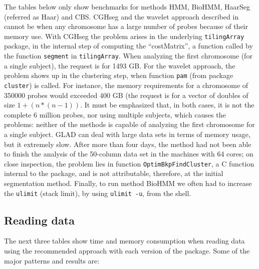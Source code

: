 \documentclass[a4paper,11pt]{article}
\begin{document}
The tables below only show benchmarks for methods HMM, BioHMM, HaarSeg
(referred as Haar) and CBS. CGHseg and the wavelet approach described in
\cite{waves-hsu} cannot be when any chromosome has a large number of
probes because of their memory use. With CGHseg the problem arises in the
underlying \texttt{tilingArray} package, in the internal step of computing
the ``costMatrix'', a function called by the function \texttt{segment} in
\texttt{tilingArray}.  When analyzing the first chromosome (for a single
subject), the request is for 1493 GB.  For the wavelet approach, the
problem shows up in the clustering step, when function \texttt{pam} (from
package \texttt{cluster}) is called. For instance, the memory requirements
for a chromosome of 350000 probes would exceeded 400 GB (the request is
for a vector of doubles of size $1 + (n * (n - 1))$.  It must be
emphasized that, in both cases, it is not the complete 6 million probes,
nor using multiple subjects, which causes the problems: neither of the
methods is capable of analyzing the first chromosome for a single subject.
GLAD can deal with large data sets in terms of memory usage, but it
extremely slow. After more than four days, the method had not been able to
finish the analysis of the 50-column data set in the machines with 64
cores; on close inspection, the problem lies in function
\texttt{OptimBkpFindCluster}, a C function internal to the package, and is
not attributable, therefore, at the initial segmentation method.  Finally,
to run method BioHMM we often had to increase the \texttt{ulimit} (stack
limit), by using \texttt{ulimit -u}, from the shell.



\clearpage
\subsection{Reading data}\label{comp-read}

The next three tables show time and memory consumption when reading data
using the recommended approach with each version of the package. Some of
the major patterns and results are:
\end{document}
